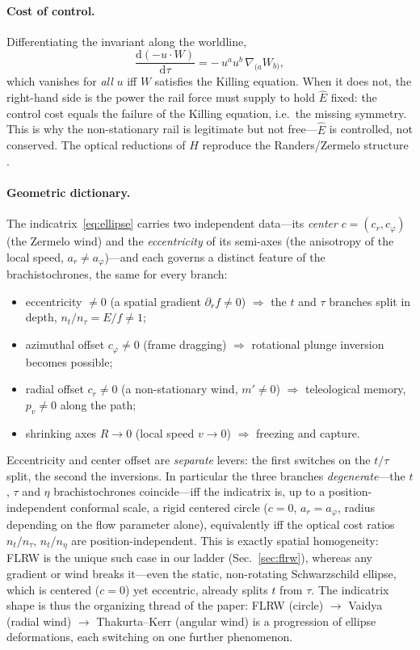 \documentclass[12pt]{iopart}
\newcommand{\Ehat}{\hat E}
\newcommand{\dd}{\mathrm{d}}
\begin{document}
\paragraph{Cost of control.} Differentiating the invariant along the worldline,
\begin{equation}
    \frac{\dd(-u\cdot W)}{\dd\tau}=-\,u^a u^b\,\nabla_{(a}W_{b)},
    \label{eq:cost}
\end{equation}
which vanishes for \emph{all} $u$ iff $W$ satisfies the Killing equation. When it
does not, the right-hand side is the power the rail force must supply to hold
$\Ehat$ fixed: the control cost equals the failure of the Killing equation, i.e.\
the missing symmetry. This is why the non-stationary rail is legitimate but not
free---$\Ehat$ is controlled, not conserved. The optical reductions of $H$
reproduce the Randers/Zermelo structure
\cite{GibbonsRanders2009,CaponioWind}.

\paragraph{Geometric dictionary.} The indicatrix~\eqref{eq:ellipse} carries two
independent data---its \emph{center} $c=(c_r,c_\varphi)$ (the Zermelo wind) and
the \emph{eccentricity} of its semi-axes (the anisotropy of the local speed,
$a_r\neq a_\varphi$)---and each governs a distinct feature of the
brachistochrones, the same for every branch:
\begin{itemize}\itemsep2pt
\item eccentricity $\neq0$ (a spatial gradient $\partial_r f\neq0$)
$\Rightarrow$ the $t$ and $\tau$ branches split in depth, $n_t/n_\tau=E/f\neq1$;
\item azimuthal offset $c_\varphi\neq0$ (frame dragging)
$\Rightarrow$ rotational plunge inversion becomes possible;
\item radial offset $c_r\neq0$ (a non-stationary wind, $m'\neq0$)
$\Rightarrow$ teleological memory, $p_v\neq0$ along the path;
\item shrinking axes $R\to0$ (local speed $v\to0$) $\Rightarrow$ freezing and
capture.
\end{itemize}
Eccentricity and center offset are \emph{separate} levers: the first switches on
the $t/\tau$ split, the second the inversions. In particular the three branches
\emph{degenerate}---the $t$, $\tau$ and $\eta$ brachistochrones coincide---iff the
indicatrix is, up to a position-independent conformal scale, a rigid centered
circle ($c=0$, $a_r=a_\varphi$, radius depending on the flow parameter alone),
equivalently iff the optical cost ratios $n_t/n_\tau,\,n_t/n_\eta$ are
position-independent. This is exactly spatial homogeneity: FLRW is the unique
such case in our ladder (Sec.~\ref{sec:flrw}), whereas any gradient or wind
breaks it---even the static, non-rotating Schwarzschild ellipse, which is
centered ($c=0$) yet eccentric, already splits $t$ from $\tau$. The indicatrix
shape is thus the organizing thread of the paper: FLRW (circle) $\to$ Vaidya
(radial wind) $\to$ Thakurta--Kerr (angular wind) is a progression of ellipse
deformations, each switching on one further phenomenon.
\end{document}
